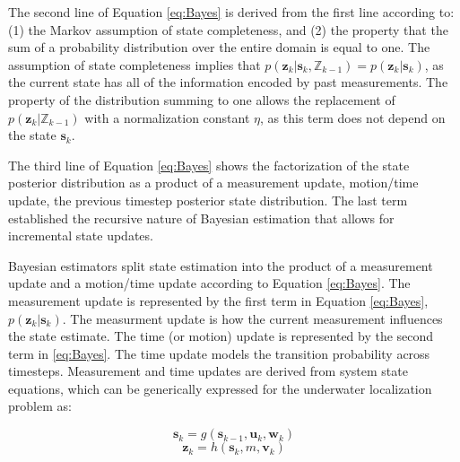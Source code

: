 The second line of Equation \ref{eq:Bayes} is derived from the first line according to: (1) the Markov assumption of state completeness, and (2) the property that the sum of a probability distribution over the entire domain is equal to one.
The assumption of state completeness implies that $p(\textbf{z}_k | \textbf{s}_k, \mathbb{Z}_{k-1}) = p(\textbf{z}_k | \textbf{s}_k)$, as the current state has all of the information encoded by past measurements.
The property of the distribution summing to one allows the replacement of $p(\textbf{z}_k | \mathbb{Z}_{k-1})$ with a normalization constant $\eta$, as this term does not depend on the state $\textbf{s}_k$. 
%

The third line of Equation \ref{eq:Bayes} shows the factorization of the state posterior distribution as a product of a measurement update, motion/time update, the previous timestep posterior state distribution.  The last term established the recursive nature of Bayesian estimation that allows for incremental state updates.  

Bayesian estimators split state estimation into the product of a measurement update and a motion/time update according to Equation \ref{eq:Bayes}.
The measurement update is represented by the first term in Equation \ref{eq:Bayes}, $p(\textbf{z}_k | \textbf{s}_k)$.
The measurment update is how the current measurement influences the state estimate.
The time (or motion) update is represented by the second term in \ref{eq:Bayes}.
The time update models the transition probability across timesteps.
Measurement and time updates are derived from system state equations, which can be generically expressed for the underwater localization problem as:

\begin{equation}
\mathbf{s}_k = g(\mathbf{s}_{k-1}, \mathbf{u}_k, \mathbf{w}_k)
\label{eq:genericMotionEquation}
\end{equation}
\begin{equation}
\mathbf{z}_k = h(\mathbf{s}_k, m, \mathbf{v}_k)
\label{eq:genericMeasurementEquation}
\end{equation}

